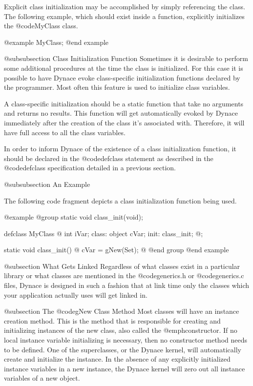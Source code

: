 Explicit class initialization may be accomplished by simply referencing
the class.  The following example, which should exist inside a function,
explicitly initializes the @code{MyClass} class.

@example
        MyClass;
@end example

@subsubsection Class Initialization Function
Sometimes it is desirable to perform some additional procedures at the
time the class is initialized.  For this case it is possible to have
Dynace evoke class-specific initialization functions declared by the
programmer.  Most often this feature is used to initialize class
variables.

A class-specific initialization should be a static function that
take no arguments and returns no results.  This function will
get automatically evoked by Dynace immediately after the creation
of the class it's associated with.  Therefore, it will have full
access to all the class variables.

In order to inform Dynace of the existence of a class initialization
function, it should be declared in the @code{defclass} statement as
described in the @code{defclass} specification detailed in a previous
section.


@subsubsection An Example

The following code fragment depicts a class initialization function
being used.

@example
@group
static  void    class_init(void);

defclass  MyClass  @{
        int     iVar;
 class:
        object  cVar;
 init:  class_init;
@};

static  void    class_init()
@{
        cVar = gNew(Set);
@}
@end group
@end example


@subsection What Gets Linked
Regardless of what classes exist in a particular library or what
classes are mentioned in the @code{generics.h} or @code{generics.c}
files, Dynace is designed in such a fashion that at link time
only the classes which your application actually uses will get linked
in.


@subsection The @code{gNew} Class Method
Most classes will have an instance creation method.  This is the method
that is responsible for creating and initializing instances of the new
class, also called the @emph{constructor}.  If no local instance
variable initializing is necessary, then no constructor method needs to be
defined.  One of the superclasses, or the Dynace kernel, will automatically
create and initialize the instance.  In the absence of any explicitly
initialized instance variables in a new instance, the Dynace kernel will
zero out all instance variables of a new object.

